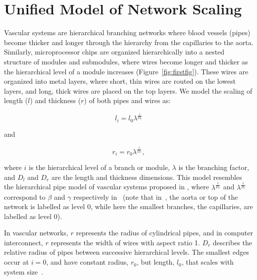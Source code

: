 \documentclass[12pt]{article}
\begin{document}
\section{Unified Model of Network Scaling}
\label{sec:unified-model}


Vascular systems are hierarchical branching networks where blood vessels
(pipes) become thicker and longer through the hierarchy from the capillaries
to the aorta. Similarly, microprocessor chips are organized hierarchically into
a nested structure of modules and submodules, where wires become longer and
thicker as the hierarchical level of a module increases
(Figure~\ref{fig:firstfig}).  These wires are organized into metal
layers, where short, thin wires are routed on the lowest layers, and long,
thick wires are placed on the top layers. We model the scaling of length ($l$)
and thickness ($r$) of both pipes and wires as:

\begin{equation}
l_i = l_0 \lambda^{\frac{i}{D_l}}
\end{equation}

\noindent and

\begin{equation}
  r_i = r_0 \lambda^{\frac{i}{D_r}},
\label{eq:rscaling}
\end{equation}

\noindent where $i$ is the hierarchical level of a branch or module, $\lambda$
is the branching factor, and $D_l$ and $D_r$ are the length and thickness
dimensions. This model resembles the hierarchical pipe model of vascular
systems proposed in \cite{west97}, where $\lambda^{\frac{1}{D_r}}$ and
$\lambda^{\frac{1}{D_l}}$ correspond to  $\beta$ and $\gamma$
respectively in~\cite{west97} (note that in~\cite{west97}, the aorta or top of the network is
labelled as level 0, while here the smallest branches, the capillaries, are
labelled as level 0).

In vascular networks, $r$ represents the radius of cylindrical pipes, and in
computer interconnect, $r$ represents the width of wires with aspect ratio 1.
$D_r$ describes the relative radius of pipes between successive hierarchical
levels.  The smallest edges occur at $i = 0$, and have constant radius, $r_0$,
but length, $l_0$, that scales with system size~\cite{banavar10}. 
\end{document}
